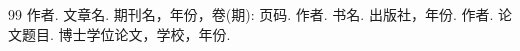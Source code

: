 
\begin{thebibliography}{99}
 作者. 文章名. 期刊名，年份，卷(期): 页码.
 作者. 书名. 出版社，年份.
 作者. 论文题目. 博士学位论文，学校，年份.
\end{thebibliography}